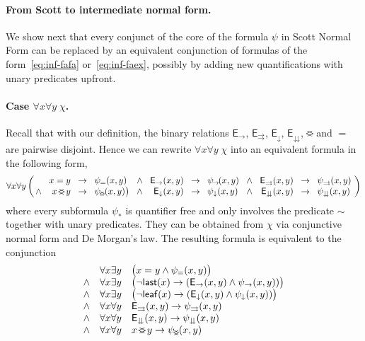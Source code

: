 \documentclass{CSML}
\newcommand\dataeq{\ensuremath{\sim}}
\newcommand\leaf{\mathsf{leaf}}
\newcommand\last{\mathsf{last}}
\newcommand\EE{\mathsf{E}}
\newcommand\NS{\EE_{\rightarrow}}
\newcommand\PC{\EE_{\downarrow}}
\newcommand\SAD{\EE_{\downdownarrows}}
\newcommand\SFS{\EE_{\rightrightarrows}}
\renewcommand\parallel{\mathbin{\!<\mkern-12mu>\!}}
\begin{document}
\paragraph{\bf From Scott to intermediate normal form.}
We show next that every conjunct of the core of the formula $\psi$ in Scott Normal Form
can be replaced by an equivalent conjunction of formulas of the
form~\eqref{eq:inf-fafa} or~\eqref{eq:inf-faex}, possibly by adding 
new quantifications with unary predicates upfront.


\paragraph{\bf Case $\forall x \forall y\; \chi$.}
Recall that with our definition, the binary relations $\NS$, $\SFS$,
$\PC$, $\SAD$, $\parallel$ and $=$ are pairwise disjoint.
Hence we can rewrite $\forall x \forall y\; \chi$ into an equivalent \fotwo formula 
in the following form,
\[
\forall x \forall y \left(\!\begin{array}{rrcl}
       & x = y & \!\to\! & \psi_{=}(x,y)\\
\!\wedge\! & x \parallel y & \!\to\! & \psi_{\parallel}(x,y) \bigr)
\end{array}
\begin{array}{rrcl}
\!\wedge\! & \NS(x, y) & \!\to\! & \psi_{\!\to\!}(x,y)\\
\!\wedge\! & \PC(x, y) & \!\to\! & \psi_{\downarrow}(x,y)
\end{array}
\begin{array}{rrcl}
\!\wedge\! & \SFS(x, y) & \!\to\! & \psi_{\rightrightarrows}(x,y)\\
\!\wedge\! & \SAD(x, y) & \!\to\! & \psi_{\downdownarrows}(x,y)
\end{array}\!\right)
\]
where every subformula $\psi_*$ is quantifier free and only involves the predicate
$\dataeq$ together with unary predicates. 
They can be obtained from $\chi$ via conjunctive normal form and De Morgan's law.
The resulting formula is equivalent to the conjunction
\[
\begin{array}{cll}
       & \forall x \exists y & \bigl( x = y \wedge \psi_{=}(x,y)\bigl)\\
\wedge & \forall x \exists y & 
  \bigl( \neg\last(x) \to (\NS(x, y) \wedge \psi_{\to}(x,y)) \bigr)\\
\wedge & \forall x \exists y & 
  \bigl( \neg\leaf(x) \to (\PC(x, y) \wedge \psi_{\downarrow}(x,y)) \bigr)\\
\wedge & \forall x \forall y & \SFS(x, y) \to \psi_{\rightrightarrows}(x,y)\\
\wedge & \forall x \forall y & \SAD(x, y) \to \psi_{\downdownarrows}(x,y)\\                  
\wedge & \forall x \forall y & x \parallel y \to \psi_{\parallel}(x,y)\\                  
\end{array}
\]
\end{document}
